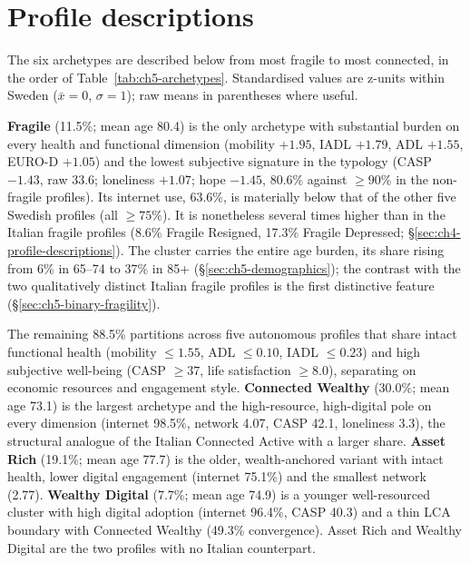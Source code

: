 \section{Profile descriptions}
\label{sec:ch5-profile-descriptions}

The six archetypes are described below from most fragile to most connected, in the order of Table~\ref{tab:ch5-archetypes}. Standardised values are z-units within Sweden ($\bar{x} = 0$, $\sigma = 1$); raw means in parentheses where useful.

\label{sec:ch5-fragile}
\textbf{Fragile} (11.5\%; mean age 80.4) is the only archetype with substantial burden on every health and functional dimension (mobility $+1.95$, IADL $+1.79$, ADL $+1.55$, EURO-D $+1.05$) and the lowest subjective signature in the typology (CASP $-1.43$, raw 33.6; loneliness $+1.07$; hope $-1.45$, 80.6\% against $\geq 90\%$ in the non-fragile profiles). Its internet use, 63.6\%, is materially below that of the other five Swedish profiles (all $\geq 75\%$). It is nonetheless several times higher than in the Italian fragile profiles (8.6\% Fragile Resigned, 17.3\% Fragile Depressed; \S\ref{sec:ch4-profile-descriptions}). The cluster carries the entire age burden, its share rising from 6\% in 65--74 to 37\% in 85+ (\S\ref{sec:ch5-demographics}); the contrast with the two qualitatively distinct Italian fragile profiles is the first distinctive feature (\S\ref{sec:ch5-binary-fragility}).

\label{sec:ch5-five-autonomous}
The remaining 88.5\% partitions across five autonomous profiles that share intact functional health (mobility $\leq 1.55$, ADL $\leq 0.10$, IADL $\leq 0.23$) and high subjective well-being (CASP $\geq 37$, life satisfaction $\geq 8.0$), separating on economic resources and engagement style. \textbf{Connected Wealthy} (30.0\%; mean age 73.1) is the largest archetype and the high-resource, high-digital pole on every dimension (internet 98.5\%, network 4.07, CASP 42.1, loneliness 3.3), the structural analogue of the Italian Connected Active with a larger share. \textbf{Asset Rich} (19.1\%; mean age 77.7) is the older, wealth-anchored variant with intact health, lower digital engagement (internet 75.1\%) and the smallest network (2.77). \textbf{Wealthy Digital} (7.7\%; mean age 74.9) is a younger well-resourced cluster with high digital adoption (internet 96.4\%, CASP 40.3) and a thin LCA boundary with Connected Wealthy (49.3\% convergence). Asset Rich and Wealthy Digital are the two profiles with no Italian counterpart.

